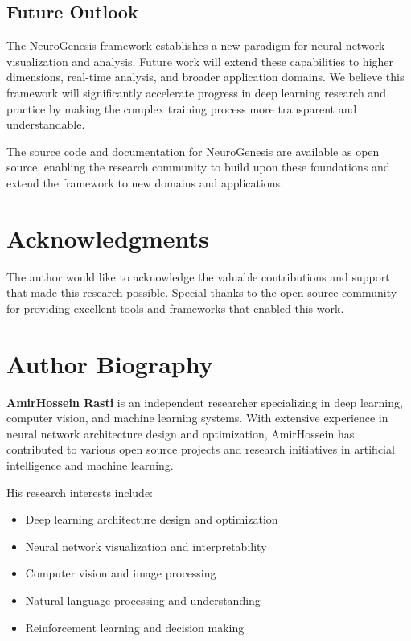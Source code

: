 \documentclass[12pt,a4paper]{article}
\begin{document}
\subsection{Future Outlook}

The NeuroGenesis framework establishes a new paradigm for neural network visualization and analysis. Future work will extend these capabilities to higher dimensions, real-time analysis, and broader application domains. We believe this framework will significantly accelerate progress in deep learning research and practice by making the complex training process more transparent and understandable.

The source code and documentation for NeuroGenesis are available as open source, enabling the research community to build upon these foundations and extend the framework to new domains and applications.

\section{Acknowledgments}

The author would like to acknowledge the valuable contributions and support that made this research possible. Special thanks to the open source community for providing excellent tools and frameworks that enabled this work.

\section{Author Biography}

\textbf{AmirHossein Rasti} is an independent researcher specializing in deep learning, computer vision, and machine learning systems. With extensive experience in neural network architecture design and optimization, AmirHossein has contributed to various open source projects and research initiatives in artificial intelligence and machine learning.

His research interests include:
\begin{itemize}
    \item Deep learning architecture design and optimization
    \item Neural network visualization and interpretability
    \item Computer vision and image processing
    \item Natural language processing and understanding
    \item Reinforcement learning and decision making
\end{itemize}
\end{document}
